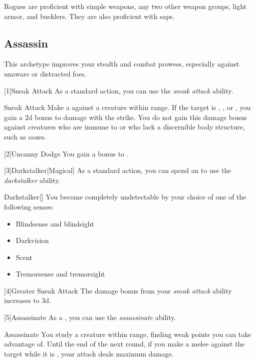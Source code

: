         Rogues are proficient with simple weapons, any two other weapon groups, light armor, and bucklers.
        They are also proficient with saps.

    \subsection{Assassin}
        This archetype improves your stealth and combat prowess, especially against unaware or distracted foes.

        [1]{Sneak Attack} As a standard action, you can use the \textit{sneak attack} ability.
        \begin{ability}{Sneak Attack}
            Make a  against a creature within \rngclose range.
            If the target is \unaware, , or , you gain a \plus2d bonus to damage with the strike.
            You do not gain this damage bonus against creatures who are immune to  or who lack a discernible body structure, such as oozes.
        \end{ability}

        [2]{Uncanny Dodge} You gain a  bonus to .

        [3]{Darkstalker}[Magical] As a standard action, you can spend an  to use the \textit{darkstalker} ability.
        \begin{ability}{Darkstalker}[]
            You become completely undetectable by your choice of one of the following senses:
            \begin{itemize}
                \item Blindsense and blindsight
                \item Darkvision
                \item Scent
                \item Tremorsense and tremorsight
            \end{itemize}
        \end{ability}

        [4]{Greater Sneak Attack}
        The damage bonus from your \textit{sneak attack} ability increases to \plus3d.

        [5]{Assassinate} As a , you can use the \textit{assassinate} ability.
        \begin{ability}{Assassinate}
            You study a creature within \rnglong range, finding weak points you can take advantage of.
            Until the end of the next round, if you make a melee  against the target while it is \unaware, your attack deals maximum damage.
        \end{ability}

